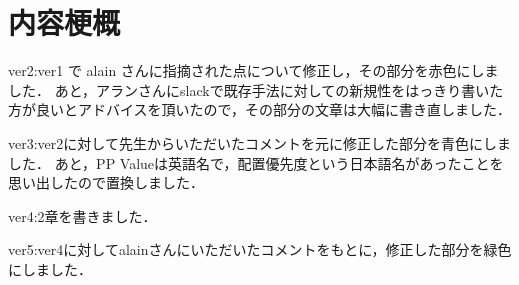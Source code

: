 \chapter*{内容梗概}
ver2:ver1 で alain さんに指摘された点について修正し，その部分を赤色にしました．
あと，アランさんにslackで既存手法に対しての新規性をはっきり書いた方が良いとアドバイスを頂いたので，その部分の文章は大幅に書き直しました．

ver3:ver2に対して先生からいただいたコメントを元に修正した部分を青色にしました．
あと，PP Valueは英語名で，配置優先度という日本語名があったことを思い出したので置換しました．

ver4:2章を書きました．

ver5:ver4に対してalainさんにいただいたコメントをもとに，修正した部分を緑色にしました．

